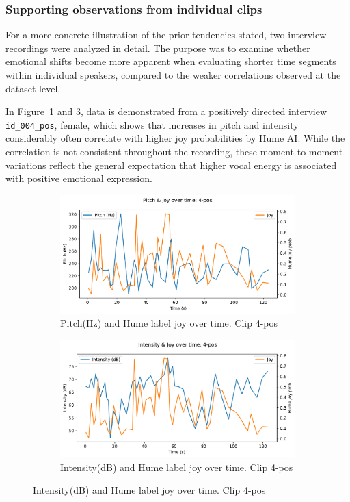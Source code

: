 \subsubsection{Supporting observations from individual clips}

For a more concrete illustration of the prior tendencies stated, two interview recordings were analyzed in detail. The purpose was to examine whether emotional shifts become more apparent when evaluating shorter time segments within individual speakers, compared to the weaker correlations observed at the dataset level.

In Figure~\ref{fig:pitch-4-pos} and \ref{fig:intensity-4-pos}, data is demonstrated from a positively directed interview \texttt{id\_004\_pos}, female, which shows that increases in pitch and intensity considerably often correlate with higher joy probabilities by Hume AI. While the correlation is not consistent throughout the recording, these moment-to-moment variations reflect the general expectation that higher vocal energy is associated with positive emotional expression. 

\begin{figure}[H]
    \centering
    \begin{subfigure}[b]{0.47\textwidth}
        \includegraphics[width=\linewidth]{png/results/rq1/pitch_joy_4-pos.pdf}
        \caption{Pitch(Hz) and Hume label joy over time. Clip 4-pos}
        \label{fig:pitch-4-pos}
    \end{subfigure}
    \hspace{0.04\textwidth}
    \begin{subfigure}[b]{0.47\textwidth}
        \includegraphics[width=\linewidth]{png/results/rq1/intensity_joy_4-pos.pdf}
        \caption{Intensity(dB) and Hume label joy over time. Clip 4-pos}
        \label{fig:intensity-4-pos}
    \end{subfigure}
\end{figure}

